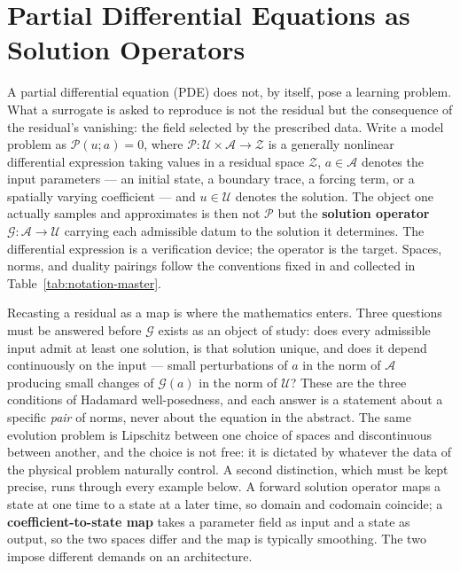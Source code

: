 
\chapter{Partial Differential Equations as Solution Operators}
\label{ch:part1-partial-differential-equations-as-solution}
\label{sec:pde_operators}

A partial differential equation (PDE) does not, by itself, pose a learning
problem. What a surrogate is asked to reproduce is not the residual but the
consequence
of the residual's vanishing: the field selected by the prescribed data. Write a
model problem as $\mathcal{P}(u; a) = 0$, where $\mathcal{P} : \mathcal{U} \times
\mathcal{A} \to \mathcal{Z}$ is a generally nonlinear differential expression
taking values in a residual space $\mathcal{Z}$, $a \in \mathcal{A}$ denotes the
input parameters --- an initial state, a boundary trace, a forcing term, or a
spatially varying coefficient --- and $u \in \mathcal{U}$ denotes the solution.
The object one actually samples and approximates is then not $\mathcal{P}$ but the
\textbf{solution
operator} $\mathcal{G} : \mathcal{A} \to \mathcal{U}$ carrying each admissible
datum to the solution it determines. The differential expression is a
verification device; the operator is the target. Spaces, norms, and duality
pairings follow the conventions fixed in
 and collected in
Table~\ref{tab:notation-master}.

Recasting a residual as a map is where the mathematics
enters. Three questions must be answered before $\mathcal{G}$ exists
as an object of study: does every admissible input admit at least one solution,
is that solution unique, and does it depend continuously on the input --- small
perturbations of $a$ in the norm of $\mathcal{A}$ producing small changes of
$\mathcal{G}(a)$ in the norm of $\mathcal{U}$? These are the three
conditions of Hadamard
well-posedness, and each answer is a statement about a specific \emph{pair} of
norms, never about the equation in the abstract. The same evolution problem is
Lipschitz between one choice of spaces and discontinuous between another, and
the choice is not free: it is dictated by whatever the data of the physical
problem naturally control. A second distinction, which must be kept precise,
runs through every example below. A forward
solution operator maps a state at one time to a state at a later time, so
domain and codomain coincide; a
\textbf{coefficient-to-state map} takes a
parameter field as input and a state as output, so the two spaces differ and the
map is typically smoothing. The two impose different demands on an architecture.

